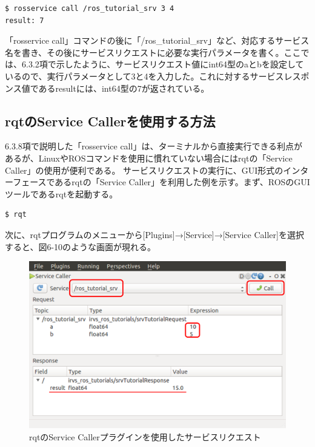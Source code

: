\begin{lstlisting}[language=ROS]
$ rosservice call /ros_tutorial_srv 3 4
result: 7
\end{lstlisting}

「rosservice call」コマンドの後に「/ros\_tutorial\_srv」など、対応するサービス名を書き、その後にサービスリクエストに必要な実行パラメータを書く。ここでは、6.3.2項で示したように、サービスリクエスト値にint64型のaとbを設定しているので、実行パラメータとして3と4を入力した。これに対するサービスレスポンス値であるresultには、int64型の7が返されている。

\subsection{rqtのService Callerを使用する方法}

6.3.8項で説明した「rosservice call」は、ターミナルから直接実行できる利点があるが、LinuxやROSコマンドを使用に慣れていない場合にはrqtの「Service Caller」の使用が便利である。
サービスリクエストの実行に、GUI形式のインターフェースであるrqtの「Service Caller」を利用した例を示す。まず、ROSのGUIツールであるrqtを起動する。

\begin{lstlisting}[language=ROS]
$ rqt
\end{lstlisting}

次に、rqtプログラムのメニューから[Plugins]→[Service]→[Service Caller]を選択すると、図6-10のような画面が現れる。

\begin{figure}[htp]
  \centering
  \includegraphics[width=\columnwidth]{pictures/chapter6/pic_06_10.png}
  \caption{rqtのService Callerプラグインを使用したサービスリクエスト}
\end{figure}

